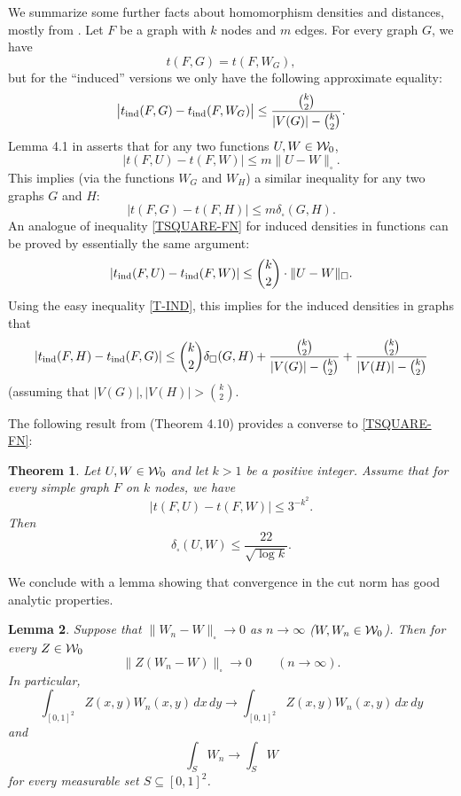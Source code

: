 \documentclass{article}
\newtheorem{theorem}{Theorem}[section]
\newtheorem{lemma}[theorem]{Lemma}
\begin{document}
We summarize some further facts about homomorphism densities and
distances, mostly from \cite{LSz}. Let $F$ be a graph with $k$ nodes
and $m$ edges. For every graph $G$, we have
\[
t(F,G)=t(F,W_G),
\]
but for the ``induced'' versions we only have the following
approximate equality:
\begin{equation}\label{T-IND}
\bigl|t_{\rm ind}(F,G)-t_{\rm ind}(F,W_G)\bigr| \le
\frac{\binom{k}{2}}{|V(G)|-\binom{k}{2}}.
\end{equation}
Lemma 4.1 in \cite{LSz} asserts that for any two functions
$U,W\in\mathcal{W}_0$,
\begin{equation}\label{TSQUARE-FN}
|t(F,U)-t(F,W)|\le m\|U-W\|_\square.
\end{equation}
This implies (via the functions $W_G$ and $W_H$) a similar inequality
for any two graphs $G$ and $H$:
\begin{equation}\label{TSQUARE-GR}
|t(F,G)-t(F,H)|\le m\delta_\square(G,H).
\end{equation}
An analogue of inequality \eqref{TSQUARE-FN} for induced densities in
functions can be proved by essentially the same argument:
\begin{equation}\label{kozel-fn}
|t_{\rm ind}(F,U)-t_{\rm ind}(F,W)|\leq \binom{k}{2} \cdot \|U-W\|_\square.
\end{equation}
Using the easy inequality \eqref{T-IND}, this implies for the induced
densities in graphs that
\begin{equation}\label{kozel}
|t_{\rm ind}(F,H)-t_{\rm ind}(F,G)|\leq \binom{k}{2} \delta_{\square}(G,H) +
\frac{\binom{k}{2}}{|V(G)|-\binom{k}{2}}+
\frac{\binom{k}{2}}{|V(H)|-\binom{k}{2}}
\end{equation}
(assuming that $|V(G)|,|V(H)| > \binom{k}{2}$.

The following result from \cite{BCLSV1} (Theorem 4.10) provides a
converse to \eqref{TSQUARE-FN}:

\begin{theorem}\label{LEFT-CLOSE}
Let $U,W\in\mathcal{W}_0$ and let $k>1$ be a positive integer. Assume that
for every simple graph $F$ on $k$ nodes, we have
\[
|t(F,U)-t(F,W)|\le 3^{-{k^2}}.
\]
Then
\[
\delta_\square(U, W) \le
{\frac{22}{\sqrt{\log k}}.}
\]
\end{theorem}

We conclude with a lemma showing that convergence in the cut norm has
good analytic properties.

\begin{lemma}\label{WSTAR}
Suppose that $\|W_n-W\|_\square\to 0$ as $n\to\infty$
($W,W_n\in\mathcal{W}_0$). Then for every $Z\in\mathcal{W}_0$
\[
\|Z(W_n-W)\|_\square \to 0 \qquad (n\to \infty).
\]
In particular,
\[
\int_{[0,1]^2} Z(x,y)W_n(x,y)\,dx\,dy \to \int_{[0,1]^2}
Z(x,y)W_n(x,y)\,dx\,dy
\]
and
\[
\int_S W_n \to \int_S W
\]
for every measurable set $S\subseteq [0,1]^2$.
\end{lemma}
\end{document}
